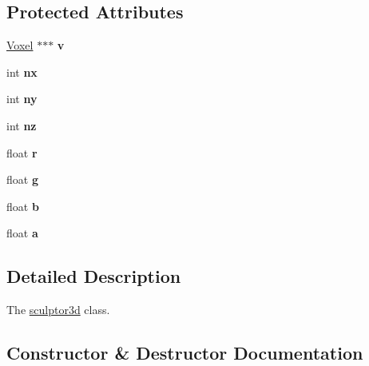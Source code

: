 \subsection*{Protected Attributes}
\begin{DoxyCompactItemize}
\item 
\mbox{\label{classsculptor3d_aa203c37fa6a40ce6a96b818b999291f0}} 
\mbox{\hyperlink{struct_voxel}{Voxel}} $\ast$$\ast$$\ast$ {\bfseries v}
\item 
\mbox{\label{classsculptor3d_ae609eab63f0f21d15e2713928001212c}} 
int {\bfseries nx}
\item 
\mbox{\label{classsculptor3d_a270d21a9e67e1bf6cc7103c9c6356c0f}} 
int {\bfseries ny}
\item 
\mbox{\label{classsculptor3d_a64f2963f1cb9e3a2ce0cce2c085ca7a2}} 
int {\bfseries nz}
\item 
\mbox{\label{classsculptor3d_ac9efb16a4567c5823eb5d0e1bc44c103}} 
float {\bfseries r}
\item 
\mbox{\label{classsculptor3d_ad7e2e9e417b52b665de53ec8dbcc8388}} 
float {\bfseries g}
\item 
\mbox{\label{classsculptor3d_a183f4013dfd30806b881363dc6bef47e}} 
float {\bfseries b}
\item 
\mbox{\label{classsculptor3d_a899685e3854e58c2eb44b8a4b7f78455}} 
float {\bfseries a}
\end{DoxyCompactItemize}


\subsection{Detailed Description}
The \mbox{\hyperlink{classsculptor3d}{sculptor3d}} class. 

\subsection{Constructor \& Destructor Documentation}
\mbox{\label{classsculptor3d_a36be08ef50a69161c1332f4a1cff226c}} 
